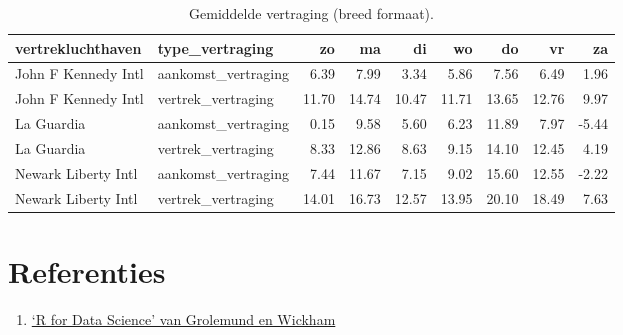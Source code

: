 \documentclass[]{memoir}
\newenvironment{Shaded}{\begin{snugshade}}{\end{snugshade}}
\newcommand{\KeywordTok}[1]{\textcolor[rgb]{0.13,0.29,0.53}{\textbf{#1}}}
\newcommand{\DataTypeTok}[1]{\textcolor[rgb]{0.13,0.29,0.53}{#1}}
\newcommand{\StringTok}[1]{\textcolor[rgb]{0.31,0.60,0.02}{#1}}
\newcommand{\OperatorTok}[1]{\textcolor[rgb]{0.81,0.36,0.00}{\textbf{#1}}}
\newcommand{\NormalTok}[1]{#1}
\providecommand{\tightlist}{%
  \setlength{\itemsep}{0pt}\setlength{\parskip}{0pt}}
\begin{document}
\begin{Shaded}
\end{Shaded}

\begin{table}[t]

\caption{\label{tab:7-15b}Gemiddelde vertraging (breed formaat).}
\centering
\fontsize{10}{12}\selectfont
\begin{tabular}{llrrrrrrr}
\toprule
vertrekluchthaven & type\_vertraging & zo & ma & di & wo & do & vr & za\\
\midrule
John F Kennedy Intl & aankomst\_vertraging & 6.39 & 7.99 & 3.34 & 5.86 & 7.56 & 6.49 & 1.96\\
John F Kennedy Intl & vertrek\_vertraging & 11.70 & 14.74 & 10.47 & 11.71 & 13.65 & 12.76 & 9.97\\
La Guardia & aankomst\_vertraging & 0.15 & 9.58 & 5.60 & 6.23 & 11.89 & 7.97 & -5.44\\
La Guardia & vertrek\_vertraging & 8.33 & 12.86 & 8.63 & 9.15 & 14.10 & 12.45 & 4.19\\
Newark Liberty Intl & aankomst\_vertraging & 7.44 & 11.67 & 7.15 & 9.02 & 15.60 & 12.55 & -2.22\\
\addlinespace
Newark Liberty Intl & vertrek\_vertraging & 14.01 & 16.73 & 12.57 & 13.95 & 20.10 & 18.49 & 7.63\\
\bottomrule
\end{tabular}
\end{table}

\section{Referenties}\label{referenties-5}

\begin{enumerate}
\def\labelenumi{\arabic{enumi}.}
\tightlist
\item
  \href{http://r4ds.had.co.nz/}{`R for Data Science' van Grolemund en
  Wickham}
\end{enumerate}
\end{document}
